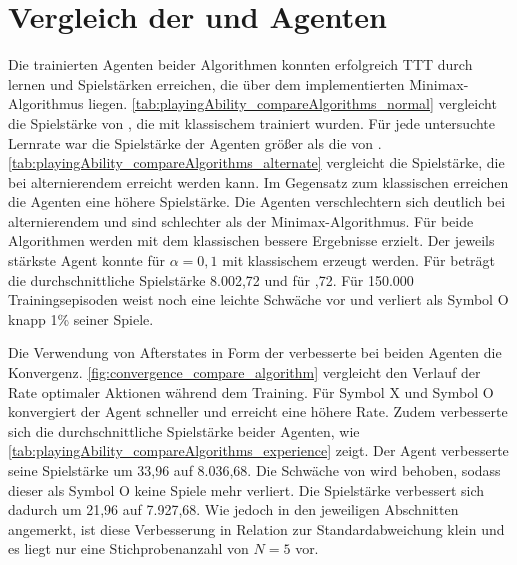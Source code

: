 \section{Vergleich der \qlearning und \sarsa Agenten}

Die trainierten Agenten beider Algorithmen konnten erfolgreich \acl{TTT} durch \splay lernen und Spielstärken erreichen, die über dem implementierten Minimax-Algorithmus liegen. 
\cref{tab:playingAbility_compareAlgorithms_normal} vergleicht die Spielstärke von \bothAlgs, die mit klassischem \splay trainiert wurden. 
Für jede untersuchte Lernrate war die Spielstärke der \qlearning Agenten größer als die von \sarsa. 
\cref{tab:playingAbility_compareAlgorithms_alternate} vergleicht die Spielstärke, die bei alternierendem \splay erreicht werden kann. 
Im Gegensatz zum klassischen \splay erreichen die \sarsa Agenten eine höhere Spielstärke. 
Die \qlearning Agenten verschlechtern sich deutlich bei alternierendem \splay und sind schlechter als der Minimax-Algorithmus. 
Für beide Algorithmen werden mit dem klassischen \splay bessere Ergebnisse erzielt. 
Der jeweils stärkste Agent konnte für $\alpha=0,1$ mit klassischem \splay erzeugt werden. 
Für \qlearning beträgt die durchschnittliche Spielstärke 8.002,72 und für ,72. 
Für 150.000 Trainingsepisoden weist \sarsa noch eine leichte Schwäche vor und verliert als Symbol O knapp 1\% seiner Spiele.


Die Verwendung von Afterstates in Form der \wtable verbesserte bei beiden Agenten die Konvergenz.
\cref{fig:convergence_compare_algorithm} vergleicht den Verlauf der Rate optimaler Aktionen während dem Training. Für Symbol X und Symbol O konvergiert der \qlearning Agent schneller und erreicht eine höhere Rate. 
Zudem verbesserte sich die durchschnittliche Spielstärke beider Agenten, wie \cref{tab:playingAbility_compareAlgorithms_experience} zeigt. 
Der \qlearning Agent verbesserte seine Spielstärke um 33,96 auf 8.036,68. 
Die Schwäche von \sarsa wird behoben, sodass dieser als Symbol O keine Spiele mehr verliert.
Die Spielstärke verbessert sich dadurch um 21,96 auf 7.927,68.
Wie jedoch in den jeweiligen Abschnitten angemerkt, ist diese Verbesserung in Relation zur Standardabweichung klein und es liegt nur eine Stichprobenanzahl von $N=5$ vor.





